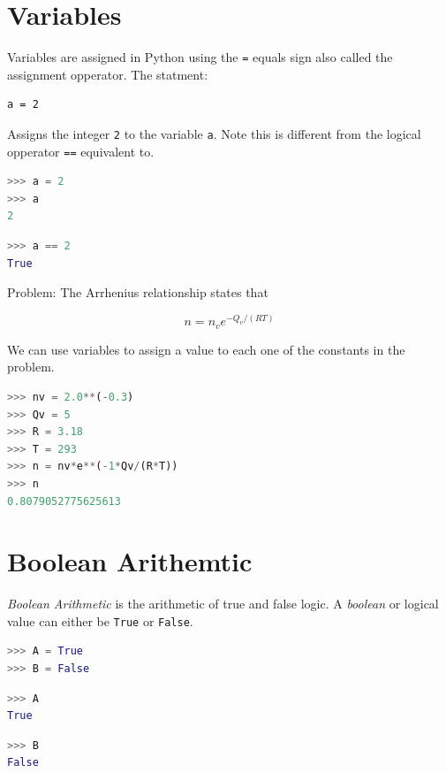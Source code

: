 \documentclass{book}
\begin{document}
    \section{Variables}\label{variables}

    Variables are assigned in Python using the \lstinline!=! equals sign
also called the assignment opperator. The statment:

\begin{lstlisting}
a = 2
\end{lstlisting}

Assigns the integer \lstinline!2! to the variable \lstinline!a!. Note
this is different from the logical opperator \lstinline!==! equivalent
to.

    \begin{lstlisting}[language=Python]
>>> a = 2
>>> a
2
\end{lstlisting}

    \begin{lstlisting}[language=Python]
>>> a == 2
True
\end{lstlisting}

    Problem: The Arrhenius relationship states that

\[ n = n_{v}e^{-Q_v/(RT)} \]

We can use variables to assign a value to each one of the constants in
the problem.

\begin{lstlisting}[language=Python]
>>> nv = 2.0**(-0.3)
>>> Qv = 5
>>> R = 3.18
>>> T = 293
>>> n = nv*e**(-1*Qv/(R*T))
>>> n
0.8079052775625613
\end{lstlisting}

    \section{Boolean Arithemtic}\label{boolean-arithemtic}

    \emph{Boolean Arithmetic} is the arithmetic of true and false logic. A
\emph{boolean} or logical value can either be \lstinline!True! or
\lstinline!False!.

    \begin{lstlisting}[language=Python]
>>> A = True
>>> B = False
\end{lstlisting}

\begin{lstlisting}[language=Python]
>>> A
True
\end{lstlisting}

\begin{lstlisting}[language=Python]
>>> B
False
\end{lstlisting}
\end{document}
